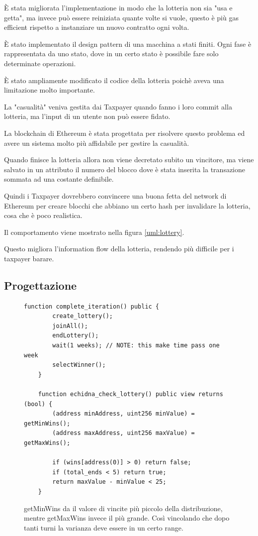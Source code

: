 \documentclass[conference]{IEEEtran}
\begin{document}
È stata migliorata l'implementazione in modo che la lotteria non sia "usa e getta", ma invece può essere
reiniziata quante volte si vuole, questo è più gas efficient rispetto a instanziare un nuovo contratto ogni volta.

È stato implementato il design pattern di una macchina a stati finiti.
Ogni fase è rappresentata da uno stato, dove in un certo stato è possibile fare solo determinate operazioni.

È stato ampliamente modificato il codice della lotteria poichè aveva una limitazione molto importante.

La "casualità" veniva gestita dai Taxpayer quando fanno i loro commit alla lotteria, ma l'input di un utente non può
essere fidato.

La blockchain di Ethereum è stata progettata per risolvere questo problema ed avere un sistema molto più affidabile per gestire la casualità.

Quando finisce la lotteria allora non viene decretato subito un vincitore, ma viene salvato in un attributo il numero del blocco dove
è stata inserita la transazione sommata ad una costante definibile.

Quindi i Taxpayer dovrebbero convincere una buona fetta del network di Ethereum per creare blocchi che abbiano un certo hash
per invalidare la lotteria, cosa che è poco realistica.


Il comportamento viene mostrato nella figura \ref{uml:lottery}.

Questo migliora l'information flow della lotteria, rendendo più difficile per i taxpayer barare.

\subsection{Progettazione}

\begin{figure}
	\label{code:V_lottery}
	\centering
	\begin{lstlisting}[style=soliditystyle]
function complete_iteration() public {
        create_lottery();
        joinAll();
        endLottery();
        wait(1 weeks); // NOTE: this make time pass one week
        selectWinner();
    }

    function echidna_check_lottery() public view returns (bool) {
        (address minAddress, uint256 minValue) = getMinWins();
        (address maxAddress, uint256 maxValue) = getMaxWins();

        if (wins[address(0)] > 0) return false;
        if (total_ends < 5) return true;
        return maxValue - minValue < 25;
    }
  \end{lstlisting}
	\caption{getMinWins da il valore di vincite più piccolo della distribuzione, mentre getMaxWins invece il più grande. Così vincolando che dopo
		tanti turni la varianza deve essere in un certo range.}
\end{figure}
\end{document}
